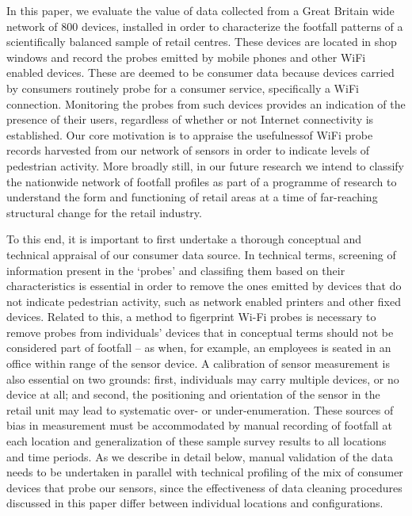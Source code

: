 In this paper, we evaluate the value of data collected from a Great Britain wide network of 800 devices, installed in order to characterize the footfall patterns of a scientifically balanced sample of retail centres.
These devices are located in shop windows and record the probes emitted by mobile phones and other WiFi enabled devices.
These are deemed to be consumer data because devices carried by consumers routinely probe for a consumer service, specifically a WiFi connection.
Monitoring the probes from such devices provides an indication of the presence of their users, regardless of whether or not Internet connectivity is established.
Our core motivation is to appraise the usefulnessof WiFi probe records harvested from our network of sensors in order to indicate levels of pedestrian activity.
More broadly still, in our future research we intend to classify the nationwide network of footfall profiles as part of a programme of research to understand the form and functioning of retail areas at a time of far-reaching structural change for the retail industry.

To this end, it is important to first undertake a thorough conceptual and technical appraisal of our consumer data source.
In technical terms, screening of information present in the `probes' and classifing them based on their characteristics is essential in order to remove the ones emitted by devices that do not indicate pedestrian activity, such as network enabled printers and other fixed devices.
Related to this, a method to figerprint Wi-Fi probes is necessary to remove probes from individuals’ devices that in conceptual terms should not be considered part of footfall – as when, for example, an employees is seated in an office within range of the sensor device.
A calibration of sensor measurement is also essential on two grounds: first, individuals may carry multiple devices, or no device at all; and second, the positioning and orientation of the sensor in the retail unit may lead to systematic over- or under-enumeration.
These sources of bias in measurement must be accommodated by manual recording of footfall at each location and generalization of these sample survey results to all locations and time periods.
As we describe in detail below, manual validation of the data needs to be undertaken in parallel with technical profiling of the mix of consumer devices that probe our sensors, since the effectiveness of data cleaning procedures discussed in this paper differ between individual locations and configurations.

